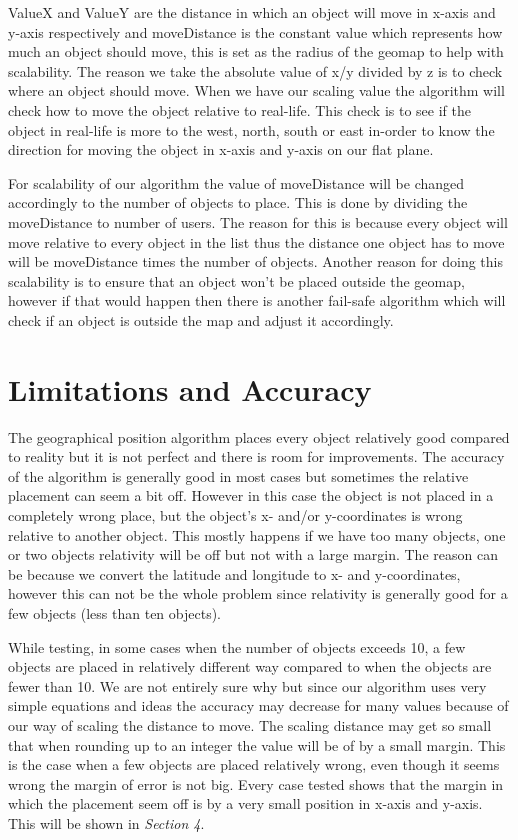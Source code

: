 ValueX and ValueY are the distance in which an object will move in x-axis and y-axis respectively and moveDistance is the constant value which represents how much an object should move, this is set as the radius of the geomap to help with scalability. The reason we take the absolute value of x/y divided by z is to check where an object should move. When we have our scaling value the algorithm will check how to move the object relative to real-life. This check is to see if the object in real-life is more to the west, north, south or east in-order to know the direction for moving the object in x-axis and y-axis on our flat plane.

For scalability of our algorithm the value of moveDistance will be changed accordingly to the number of objects to place. This is done by dividing the moveDistance to number of users. The reason for this is because every object will move relative to every object in the list thus the distance one object has to move will be moveDistance times the number of objects. Another reason for doing this scalability is to ensure that an object won't be placed outside the geomap, however if that would happen then there is another fail-safe algorithm which will check if an object is outside the map and adjust it accordingly.

\section{Limitations and Accuracy}
\label{sec:limacc}

The geographical position algorithm places every object relatively good compared to reality but it is not perfect and there is room for improvements. The accuracy of the algorithm is generally good in most cases but sometimes the relative placement can seem a bit off. However in this case the object is not placed in a completely wrong place, but the object's x- and/or y-coordinates is wrong relative to another object. This mostly happens if we have too many objects, one or two objects relativity will be off but not with a large margin. The reason can be because we convert the latitude and longitude to x- and y-coordinates, however this can not be the whole problem since relativity is generally good for a few objects (less than ten objects).

While testing, in some cases when the number of objects exceeds 10, a few objects are placed in relatively different way compared to when the objects are fewer than 10. We are not entirely sure why but since our algorithm uses very simple equations and ideas the accuracy may decrease for many values because of our way of scaling the distance to move. The scaling distance may get so small that when rounding up to an integer the value will be of by a small margin. This is the case when a few objects are placed relatively wrong, even though it seems wrong the margin of error is not big. Every case tested shows that the margin in which the placement seem off is by a very small position in x-axis and y-axis. This will be shown in \textit{Section 4}.

